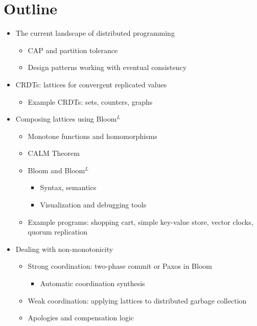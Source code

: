 \documentclass{sig-alternate}
\def\blooml{Bloom$^L$\xspace}
\begin{document}
\section{Outline}

\begin{itemize}
\item
  The current landscape of distributed programming
  \begin{itemize}
  \item
    CAP and partition tolerance~\cite{Brewer2012,Brewer2000}
  \item
    Design patterns working with eventual consistency
  \end{itemize}
\item
  CRDTs: lattices for convergent replicated values
  \begin{itemize}
  \item
    Example CRDTs: sets, counters, graphs
  \end{itemize}
\item
  Composing lattices using \blooml
  \begin{itemize}
  \item
    Monotone functions and homomorphisms
  \item
    CALM Theorem
  \item
    Bloom and \blooml
    \begin{itemize}
    \item
      Syntax, semantics
    \item
      Visualization and debugging tools
    \end{itemize}
  \item
    Example programs: shopping cart, simple key-value store, vector clocks,
    quorum replication
  \end{itemize}
\item
  Dealing with non-monotonicity
  \begin{itemize}
  \item
    Strong coordination: two-phase commit or Paxos in Bloom
    \begin{itemize}
    \item
      Automatic coordination synthesis
    \end{itemize}
  \item
    Weak coordination: applying lattices to distributed garbage collection
  \item
    Apologies and compensation logic~\cite{Garcia-Molina1987,Helland2009,Korth1990}
  \end{itemize}

\end{itemize}
\end{document}

